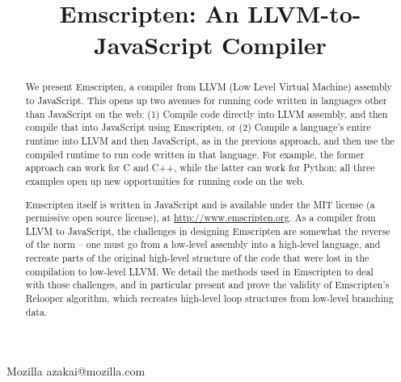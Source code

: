\documentclass[preprint,10pt]{sigplanconf}
\begin{document}
\title{Emscripten: An LLVM-to-JavaScript Compiler}
\copyrightdata{[to be supplied]} 
\titlebanner{}        %
\preprintfooter{}   %
           {Mozilla}
           {azakai@mozilla.com}

\maketitle


\begin{abstract}
We present Emscripten, a compiler from LLVM (Low Level Virtual Machine) assembly to JavaScript. This
opens up two avenues for running code written
in languages other than JavaScript on the web: (1) Compile code directly into LLVM assembly, and
then compile that into JavaScript using Emscripten, or (2) Compile
a language's entire runtime into LLVM and then JavaScript, as in the previous
approach, and then use the compiled runtime to run code written in that language. For example, the
former approach can work for C and C++, while the latter can work for Python; all three
examples open up new opportunities for running code on the web.

Emscripten itself is written in JavaScript and is available under the MIT
license (a permissive open source license), at \url{http://www.emscripten.org}.
As a compiler from LLVM to JavaScript, the challenges in designing
Emscripten are somewhat the reverse of the norm -- one must go from a low-level
assembly into a high-level language, and recreate parts of the original
high-level structure of the code that were lost in the compilation to
low-level LLVM. We detail the methods used in
Emscripten to deal with those challenges, and in particular present and prove
the validity of Emscripten's Relooper
algorithm, which recreates high-level loop structures from low-level
branching data.
\end{abstract}
\end{document}
